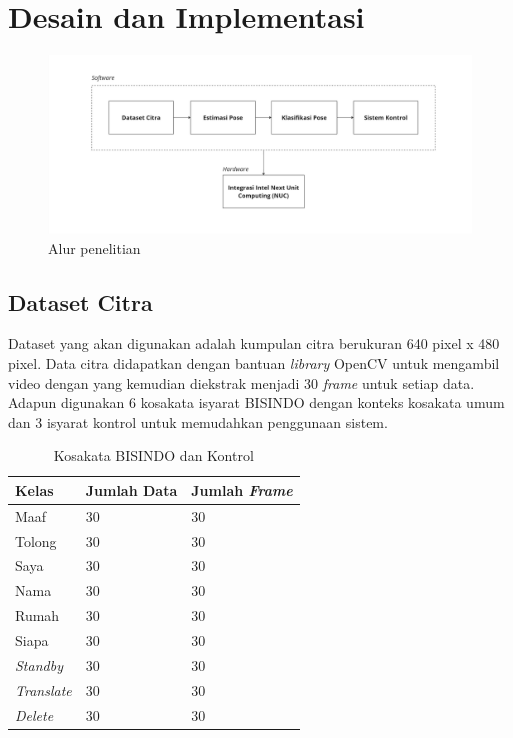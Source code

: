 \section{Desain dan Implementasi}
\label{sec:desaindanimplementasi}

\begin{figure}[ht]
  \centering

  \includegraphics[scale=0.095]{gambar/bab3-block-diagram-nuc.jpg}

  \caption{Alur penelitian}
  \label{fig:blockdiagrammethod}
\end{figure}

\subsection{Dataset Citra}
\label{subsec:datasetcitra}

Dataset yang akan digunakan adalah kumpulan citra berukuran 640 pixel x 480 pixel. Data citra didapatkan dengan bantuan \emph{library} OpenCV untuk mengambil video dengan yang kemudian diekstrak menjadi 30 \emph{frame} untuk setiap data. Adapun digunakan 6 kosakata isyarat BISINDO dengan konteks kosakata umum dan 3 isyarat kontrol untuk memudahkan penggunaan sistem. 

\begin{table}[H]
  \caption{Kosakata BISINDO dan Kontrol}
  \label{tb:kosakataBISINDO}
  \centering
  \begin{tabular}{lll}
    \toprule
    \textbf{Kelas} & \textbf{Jumlah Data} & \textbf{Jumlah \emph{Frame}} \\
    \midrule
    Maaf                        & 30            & 30 \\
    Tolong                      & 30            & 30 \\
    Saya                        & 30            & 30 \\
    Nama                        & 30            & 30 \\
    Rumah                       & 30            & 30 \\
    Siapa                       & 30            & 30 \\
    \textit{Standby}                       & 30             & 30 \\
    \textit{Translate}                     & 30             & 30 \\
    \textit{Delete}                        & 30             & 30 \\
    \bottomrule
  \end{tabular}
\end{table}


